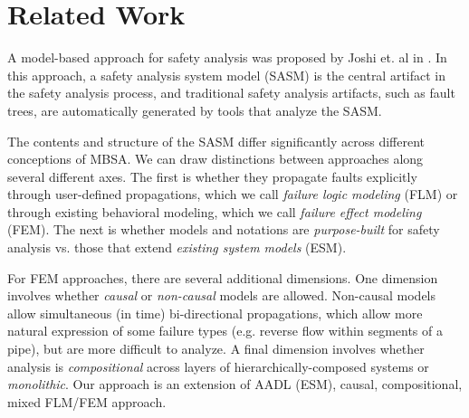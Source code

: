 \section{Related Work}
\label{sec:related_work}

A model-based approach for safety analysis was proposed by Joshi et. al in \cite{Joshi05:Dasc, Joshi05:SafeComp, Joshi07:Hase}.  In this approach, a safety analysis system model (SASM) is the central artifact in the safety analysis process, and traditional safety analysis artifacts, such as fault trees, are automatically generated by tools that analyze the SASM.

The contents and structure of the SASM differ significantly across different conceptions of MBSA.  We can draw distinctions between approaches along several different axes.  The first is whether they propagate faults explicitly through user-defined propagations, which we call {\em failure logic modeling} (FLM) or through existing behavioral modeling, which we call {\em failure effect modeling} (FEM).  The next is whether models and notations are {\em purpose-built} for safety analysis vs. those that extend {\em existing system models} (ESM).

For FEM approaches, there are several additional dimensions.  One dimension involves whether {\em causal} or {\em non-causal} models are allowed.  Non-causal models allow simultaneous (in time) bi-directional %
 propagations, which allow more natural expression of some failure types (e.g. reverse flow within segments of a pipe), but are more difficult to analyze.  A final dimension involves whether analysis is {\em compositional} across layers of hierarchically-composed systems or {\em monolithic}.  Our approach is an extension of AADL (ESM), causal, compositional, mixed FLM/FEM approach.



